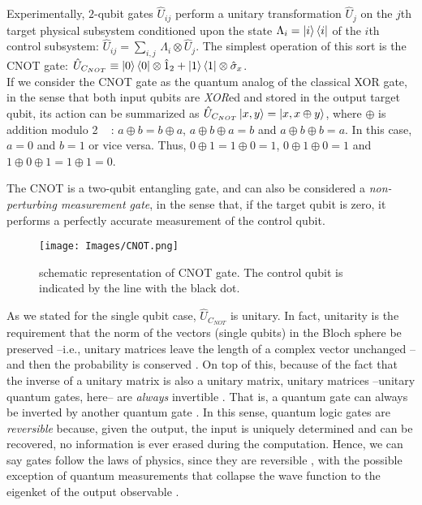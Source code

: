 \documentclass[11pt]{article}
\numberwithin{equation}{section} %
\numberwithin{figure}{section} %
\begin{document}
\begin{appendices}
Experimentally, $2$-qubit gates $\hat{U}_{ij}$ perform a unitary transformation $\hat{U}_j$ on the $j$th target physical subsystem conditioned upon the state $\Lambda_i=\ket{i}\bra{i}$ of the $i$th control subsystem: $\hat{U}_{ij}=\sum_{i,j}\,\Lambda_i\otimes\hat{U}_j$. The simplest operation of this sort is the CNOT gate: $\hat{U}_{C_{NOT}}\equiv\ket{0}\bra{0}\otimes\hat{1}_2+\ket{1}\bra{1}\otimes\hat{\sigma}_x$.\\

If we consider the CNOT gate as the quantum analog of the classical XOR gate, in the sense that both input qubits are \emph{XOR}ed and stored in the output target qubit, its action can be summarized as $\hat{U}_{C_{NOT}}\ket{x,y}=\ket{x,x\oplus y}$, where $\oplus$ is addition modulo 2 $\,\,\,$  \cite[p.~22, Eq.~(1.18)]{Nielsen}: $a\oplus b=b\oplus a$, $a\oplus b \oplus a=b$ and $a\oplus b \oplus b=a$. In this case, $a=0$ and $b=1$ or vice versa. Thus, $0\oplus 1=1\oplus 0=1$, $0\oplus 1\oplus 0=1$ and $1\oplus 0\oplus 1=1\oplus 1=0$. 

The CNOT is a two-qubit entangling gate, and can also be considered a \emph{non-perturbing measurement gate}, in the sense that, if the target qubit is zero, it performs a perfectly accurate measurement of the control qubit. \cite[p.~75, l.~12-14]{Deutsch}

\begin{figure}[H] 
	\centering
	\texttt{[image: Images/CNOT.png]}
	\caption{schematic representation of CNOT gate. The control qubit is indicated by the line with the black dot.}
	  \label{fig:CNOT}
\end{figure}
As we stated for the single qubit case, $\hat{U}_{C_{NOT}}$ is unitary. In fact, unitarity is the requirement that the norm of the vectors (single qubits) in the Bloch sphere be preserved --i.e., unitary matrices leave the length of a complex vector unchanged \cite[l.~4]{Unitary Matrix}--  and then the probability is conserved \cite[p.~21, l.~12]{Nielsen}. On top of this, because of the fact that the inverse of a unitary matrix is also a unitary matrix, unitary matrices --unitary quantum gates, here--  are \emph{always} invertible \cite[l.~10]{Unitary Matrix}. That is, a quantum gate can always be inverted by another quantum gate \cite[p.~21, l.~21-23]{Nielsen}. In this sense, quantum logic gates are \emph{reversible} because, given the output, the input is uniquely determined and can be recovered, no information is ever erased during the computation. Hence, we can say gates follow the laws of physics, since they are reversible \cite[p.~8, l.~5-6]{Shor}, with the possible exception of quantum measurements that collapse the wave function to the eigenket of the output observable \cite[p.~157, l.~1-2]{Nielsen}.




\end{appendices}
\end{document}

